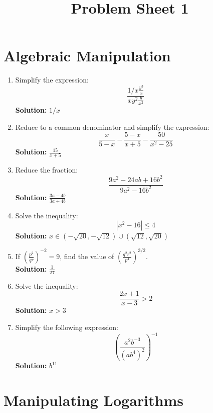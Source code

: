 \documentclass{article}
\title{Problem Sheet 1}
\author{}
\date{}
\begin{document}
\maketitle
\vspace{-1.5cm}

\section{Algebraic Manipulation}

\begin{enumerate}[leftmargin = 0.5cm, label = (\alph*), rightmargin = 0.2cm]

    \item Simplify the expression:
    \[
    \frac{1/x \frac{y^3}{x}}{x y^2 \frac{y}{x^2}}
    \]
    \textbf{Solution:} \( 1/x \)

    \item Reduce to a common denominator and simplify the expression:
    \[
    \frac{x}{5-x} - \frac{5-x}{x+5} - \frac{50}{x^2 - 25}
    \]
    \textbf{Solution:} \( \frac{15}{x + 5} \)

    \item Reduce the fraction:
    \[
    \frac{9a^2 - 24ab + 16b^2}{9a^2 - 16b^2}
    \]
    \textbf{Solution:} \( \frac{3a-4b}{3a+4b} \)

    \item Solve the inequality:
    \[
    |x^2 - 16| \leq 4
    \]
    \textbf{Solution:} $x \in (-\sqrt{20}, -\sqrt{12}) \cup (\sqrt{12}, \sqrt{20})$

    \item If \( \left( \frac{p^2}{qr} \right)^{-2} = 9 \), find the value of \( \left( \frac{q^2r^2}{p^4} \right)^{3/2} \). \\
    \textbf{Solution:} \( \frac{1}{27} \)

    \item Solve the inequality:
    \[
    \frac{2x + 1}{x - 3} > 2
    \]
    \textbf{Solution:} \( x > 3 \)

    \item Simplify the following expression:
    \[
    \left( \frac{a^2 b^{-3}}{(ab^4)^2} \right)^{-1}
    \]
    \textbf{Solution:} \( b^{11} \)

\end{enumerate}

\section{Manipulating Logarithms}
\end{document}
